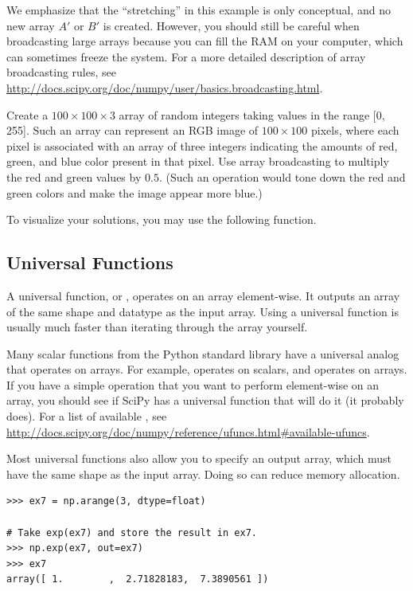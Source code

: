We emphasize that the ``stretching'' in this example is only conceptual, and no new array $A'$ or $B'$ is created. However, 
you should still be careful when broadcasting large arrays because you can fill the 
RAM on your computer, which can sometimes freeze the system.
For a more detailed description of array broadcasting rules, see 
\url{http://docs.scipy.org/doc/numpy/user/basics.broadcasting.html}.

\begin{problem}
Create a $100\times100\times3$ array of random integers taking values in the range 
[0, 255]. Such an array can represent an RGB image of $100\times100$ pixels, 
where each pixel is associated with an array of three integers indicating the 
amounts of red, green, and blue color present in that pixel.
Use array broadcasting to multiply the red and green values by $0.5$. 
(Such an operation would tone down the red and green colors and make the 
image appear more blue.) 

To visualize your solutions, you may use the following function.
 
\end{problem}

\subsection*{Universal Functions} %

A universal function, or , operates on an array element-wise. 
It outputs an array of the same shape and datatype as the input array. 
Using a universal function is usually much faster than iterating through the array yourself.

Many scalar functions from the Python standard library have a universal analog that operates on arrays. 
For example,  operates on scalars, and  operates on arrays. 
If you have a simple operation that you want to perform element-wise on an array, you should see if SciPy has a universal function that will do it (it probably does). 
For a list of available , see \url{http://docs.scipy.org/doc/numpy/reference/ufuncs.html#available-ufuncs}.

Most universal functions also allow you to specify an output array, which must have the same shape as the input array.
Doing so can reduce memory allocation.


\begin{lstlisting}
>>> ex7 = np.arange(3, dtype=float)

# Take exp(ex7) and store the result in ex7.
>>> np.exp(ex7, out=ex7) 
>>> ex7
array([ 1.        ,  2.71828183,  7.3890561 ])
\end{lstlisting}

